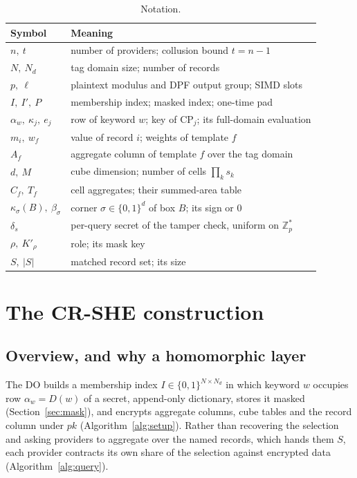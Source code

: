 \begin{table}[pos=htbp]
\caption{Notation.}
\label{tab:notation}
\centering
\footnotesize
\begin{tabular}{@{}ll@{}}
\toprule
Symbol & Meaning \\
\midrule
$n,\ t$ & number of providers; collusion bound $t=n-1$ \\
$N,\ N_d$ & tag domain size; number of records \\
$p,\ \ell$ & plaintext modulus and DPF output group; SIMD slots \\
$I,\ I',\ P$ & membership index; masked index; one-time pad \\
$\alpha_w,\ \kappa_j,\ e_j$ & row of keyword $w$; key of $\text{CP}_j$; its full-domain evaluation \\
$m_i,\ w_f$ & value of record $i$; weights of template $f$ \\
$A_f$ & aggregate column of template $f$ over the tag domain \\
$d,\ M$ & cube dimension; number of cells $\prod_k s_k$ \\
$C_f,\ T_f$ & cell aggregates; their summed-area table \\
$\kappa_\sigma(B),\ \beta_\sigma$ & corner $\sigma\in\{0,1\}^d$ of box $B$; its sign or $0$ \\
$\delta_s$ & per-query secret of the tamper check, uniform on $\mathbb{Z}_p^{*}$ \\
$\rho,\ K'_\rho$ & role; its mask key \\
$S,\ |S|$ & matched record set; its size \\
\bottomrule
\end{tabular}
\end{table}

\section{The CR-SHE construction}
\label{sec:construction}

\subsection{Overview, and why a homomorphic layer}
\label{sec:whyrep}
The DO builds a membership index $I\in\{0,1\}^{N\times N_d}$ in which keyword
$w$ occupies row $\alpha_w=D(w)$ of a secret, append-only dictionary, stores it
masked (Section~\ref{sec:mask}), and encrypts aggregate columns, cube tables
and the record column under $pk$ (Algorithm~\ref{alg:setup}). Rather than
recovering the selection and asking providers to aggregate over the named
records, which hands them $S$, each provider contracts its own share of the
selection against encrypted data (Algorithm~\ref{alg:query}).

